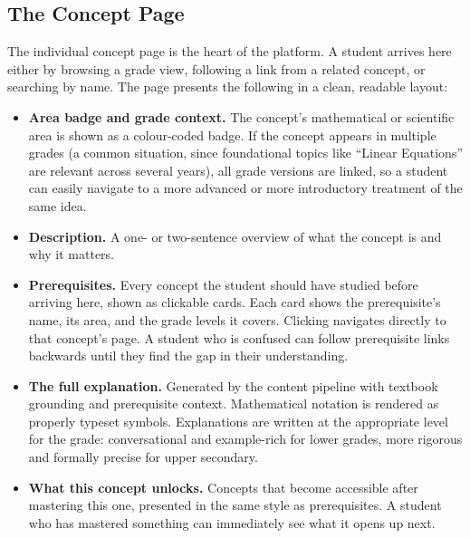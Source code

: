 \documentclass[12pt,a4paper]{article}
\begin{document}
\subsection{The Concept Page}

The individual concept page is the heart of the platform.
A student arrives here either by browsing a grade view, following a link from a related concept,
or searching by name.
The page presents the following in a clean, readable layout:

\begin{itemize}[leftmargin=2em, itemsep=0.3em]

  \item \textbf{Area badge and grade context.}
    The concept's mathematical or scientific area is shown as a colour-coded badge.
    If the concept appears in multiple grades (a common situation, since foundational topics
    like ``Linear Equations'' are relevant across several years),
    all grade versions are linked, so a student can easily navigate to a more advanced
    or more introductory treatment of the same idea.

  \item \textbf{Description.}
    A one- or two-sentence overview of what the concept is and why it matters.

  \item \textbf{Prerequisites.}
    Every concept the student should have studied before arriving here,
    shown as clickable cards.
    Each card shows the prerequisite's name, its area, and the grade levels it covers.
    Clicking navigates directly to that concept's page.
    A student who is confused can follow prerequisite links backwards until they find
    the gap in their understanding.

  \item \textbf{The full explanation.}
    Generated by the content pipeline with textbook grounding and prerequisite context.
    Mathematical notation is rendered as properly typeset symbols.
    Explanations are written at the appropriate level for the grade:
    conversational and example-rich for lower grades,
    more rigorous and formally precise for upper secondary.

  \item \textbf{What this concept unlocks.}
    Concepts that become accessible after mastering this one,
    presented in the same style as prerequisites.
    A student who has mastered something can immediately see what it opens up next.

\end{itemize}
\end{document}
